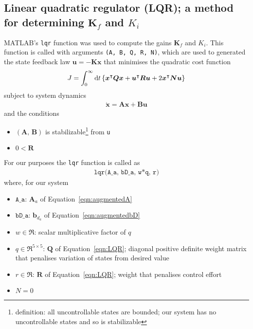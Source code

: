 \subsection{Linear quadratic regulator (LQR); a method for determining $\boldsymbol{K}_f$ and $K_i$}\label{sec:LQR}
\textsf{MATLAB}'s \texttt{lqr} function was used to compute the gains $\boldsymbol{K}_f$ and $K_i$. This function is called with arguments \texttt{(A, B, Q, R, N)}, which are used to generated the state feedback law $\boldsymbol{u} = -\boldsymbol{K}\boldsymbol{x}$ that minimises the quadratic cost function
\begin{align}
J = \int_0^\infty \mathrm{d}t\left\{\boldsymbol{x}^\intercal \boldsymbol{Q} \boldsymbol{x}
+ \boldsymbol{u}^\intercal \boldsymbol{R} \boldsymbol{u}
+ 2 \boldsymbol{x}^\intercal \boldsymbol{N} \boldsymbol{u}\right\}
\label{eqn:LQR}
\end{align}
subject to system dynamics
\begin{align*}
\boldsymbol{\dot{x}} = \boldsymbol{A}\boldsymbol{x} + \boldsymbol{B}\boldsymbol{u}
\end{align*}
and the conditions
\begin{itemize}
    \item $(\boldsymbol{A}, \, \boldsymbol{B})$ is stabilizable\footnote{definition: all uncontrollable states are bounded; our system has no uncontrollable states and so is stabilizable} from \texttt{u}
    \item $0 < \boldsymbol{R}$
\end{itemize}
For our purposes the \texttt{lqr} function is called as
\begin{align*}
\texttt{lqr(A\_a, bD\_a, w*q, r)}
\end{align*}
where, for our system
\begin{itemize}
	\item $\texttt{A\_a}$: $\boldsymbol{A}_a$ of Equation~\ref{eqn:augmentedA}
	\item $\texttt{bD\_a}$: $\boldsymbol{b}_{d_a}$ of Equation~\ref{eqn:augmentedbD}
	\item $w \in \Re$: scalar multiplicative factor of $q$
	\item $q\in \Re^{5 \times 5}$: $\boldsymbol{Q}$ of Equation~\ref{eqn:LQR}; diagonal positive definite weight matrix that penalises variation of states from desired value
	\item $r \in \Re$: $\boldsymbol{R}$ of Equation~\ref{eqn:LQR}; weight that penalises control effort
	\item $N = 0$
\end{itemize}
